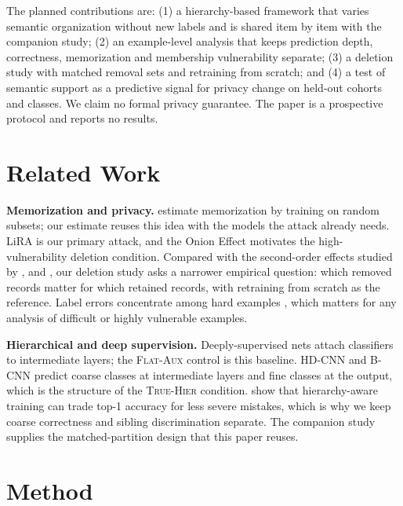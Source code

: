 \documentclass{article} %
\newcommand{\cn}[1]{\textsc{#1}}
\begin{document}
The planned contributions are: (1) a hierarchy-based framework that varies semantic organization without new labels and is shared item by item with the companion study; (2) an example-level analysis that keeps prediction depth, correctness, memorization and membership vulnerability separate; (3) a deletion study with matched removal sets and retraining from scratch; and (4) a test of semantic support as a predictive signal for privacy change on held-out cohorts and classes. We claim no formal privacy guarantee. The paper is a prospective protocol and reports no results.

\section{Related Work}
\label{sec:related}

\textbf{Memorization and privacy.} \citet{feldman2020neural} estimate memorization by training on random subsets; our estimate reuses this idea with the models the attack already needs. LiRA \citep{carlini2022lira} is our primary attack, and the Onion Effect \citep{carlini2022onion} motivates the high-vulnerability deletion condition. Compared with the second-order effects studied by \citet{borkar2025ripple}, \citet{cohen2026undeleted} and \citet{ebrahimpour2026class}, our deletion study asks a narrower empirical question: which removed records matter for which retained records, with retraining from scratch as the reference. Label errors concentrate among hard examples \citep{northcutt2021labelerrors}, which matters for any analysis of difficult or highly vulnerable examples.

\textbf{Hierarchical and deep supervision.} Deeply-supervised nets \citep{lee2015dsn} attach classifiers to intermediate layers; the \cn{Flat-Aux} control is this baseline. HD-CNN \citep{yan2015hdcnn} and B-CNN \citep{zhu2017bcnn} predict coarse classes at intermediate layers and fine classes at the output, which is the structure of the \cn{True-Hier} condition. \citet{bertinetto2020mistakes} show that hierarchy-aware training can trade top-1 accuracy for less severe mistakes, which is why we keep coarse correctness and sibling discrimination separate. The companion study supplies the matched-partition design that this paper reuses.

\section{Method}
\label{sec:method}
\end{document}
